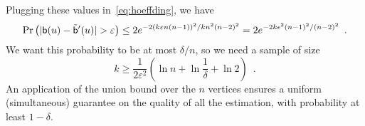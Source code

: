 Plugging these values in~\eqref{eq:hoeffding}, we have
\[
\Pr\left(|\betw(u)-\tilde\betw'(u)|>\varepsilon\right)\leq
2e^{-2(k\varepsilon n(n-1))^2/kn^2(n-2)^2}=2e^{-2k\epsilon^2(n-1)^2/(n-2)^2}\enspace.
\]
We want this probability to be at most $\delta/n$, so we need a sample of size
\[
k\geq \frac{1}{2\varepsilon^2}\left(\ln n
+\ln\frac{1}{\delta} +\ln 2\right)\enspace.
\]
An application of the union bound over the $n$ vertices ensures a uniform
(simultaneous) guarantee on the quality of
all the estimation, with probability at least $1-\delta$.

